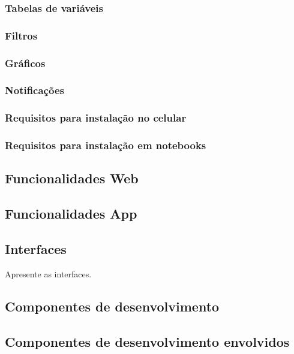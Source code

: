 \subsubsection{Tabelas de variáveis}

\subsubsection{Filtros}

\subsubsection{Gráficos}

\subsubsection{Notificações}

\subsubsection{Requisitos para instalação no celular}


\subsubsection{Requisitos para instalação em notebooks}


\subsection{Funcionalidades Web}


\subsection{Funcionalidades App}


\subsection{Interfaces}
Apresente as interfaces.


\subsection{Componentes de desenvolvimento}


\subsection{Componentes de desenvolvimento envolvidos}


